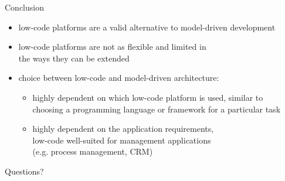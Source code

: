 \documentclass[aspectratio=169]{beamer}
\begin{document}
  \begin{frame}{Conclusion}
    \begin{itemize}
      \item low-code platforms are a valid alternative to model-driven development
      \item low-code platforms are not as flexible and limited in \\
            the ways they can be extended
      \item choice between low-code and model-driven architecture:
        \begin{itemize}
          \item highly dependent on which low-code platform is used, similar to \\
                choosing a programming language or framework for a particular task
          \item highly dependent on the application requirements, \\
                low-code well-suited for management applications \\
                (e.g. process management, CRM)
        \end{itemize}
    \end{itemize}
  \end{frame}

  \begin{frame}[standout]
    Questions?
  \end{frame}
\end{document}
